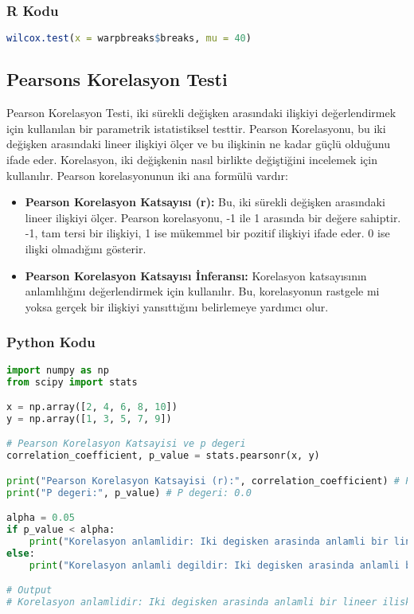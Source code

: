 \subsubsection{R Kodu}

\begin{lstlisting}[language=R]
wilcox.test(x = warpbreaks$breaks, mu = 40)
\end{lstlisting}

\newpage

\subsection{Pearsons Korelasyon Testi}
Pearson Korelasyon Testi, iki sürekli değişken arasındaki ilişkiyi değerlendirmek için kullanılan bir parametrik istatistiksel testtir. Pearson Korelasyonu, bu iki değişken arasındaki lineer ilişkiyi ölçer ve bu ilişkinin ne kadar güçlü olduğunu ifade eder. Korelasyon, iki değişkenin nasıl birlikte değiştiğini incelemek için kullanılır. Pearson korelasyonunun iki ana formülü vardır:

\begin{itemize}
    \item \textbf{Pearson Korelasyon Katsayısı (r):} Bu, iki sürekli değişken arasındaki lineer ilişkiyi ölçer. Pearson korelasyonu, -1 ile 1 arasında bir değere sahiptir. -1, tam tersi bir ilişkiyi, 1 ise mükemmel bir pozitif ilişkiyi ifade eder. 0 ise ilişki olmadığını gösterir.
    \item \textbf{Pearson Korelasyon Katsayısı İnferansı:} Korelasyon katsayısının anlamlılığını değerlendirmek için kullanılır. Bu, korelasyonun rastgele mi yoksa gerçek bir ilişkiyi yansıttığını belirlemeye yardımcı olur.
\end{itemize}

\subsubsection{Python Kodu}

\begin{lstlisting}[language=Python]
import numpy as np
from scipy import stats

x = np.array([2, 4, 6, 8, 10])
y = np.array([1, 3, 5, 7, 9])

# Pearson Korelasyon Katsayisi ve p degeri
correlation_coefficient, p_value = stats.pearsonr(x, y)

print("Pearson Korelasyon Katsayisi (r):", correlation_coefficient) # Pearson Korelasyon Katsayisi (r): 1.0
print("P degeri:", p_value) # P degeri: 0.0

alpha = 0.05
if p_value < alpha:
    print("Korelasyon anlamlidir: Iki degisken arasinda anlamli bir lineer iliski vardir.")
else:
    print("Korelasyon anlamli degildir: Iki degisken arasinda anlamli bir lineer iliski yoktur.")

# Output
# Korelasyon anlamlidir: Iki degisken arasinda anlamli bir lineer iliski vardir.
\end{lstlisting}

